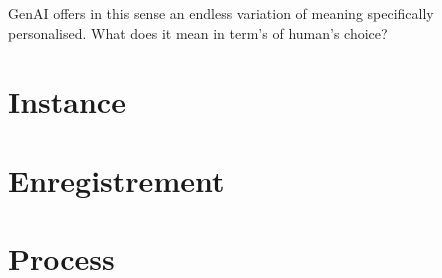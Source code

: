GenAI offers in this sense an endless variation of meaning specifically
personalised. What does it mean in term's of human's choice?
%

\section{Instance}\label{sec:Instance} %

\section{Enregistrement \parencite[4]{deleuze1983} }\label{sec:Enregistrement \parencite[4]{deleuze1983} } %
%

\section{Process}\label{sec:Process} %




\printglossaries
\printbibliography


































